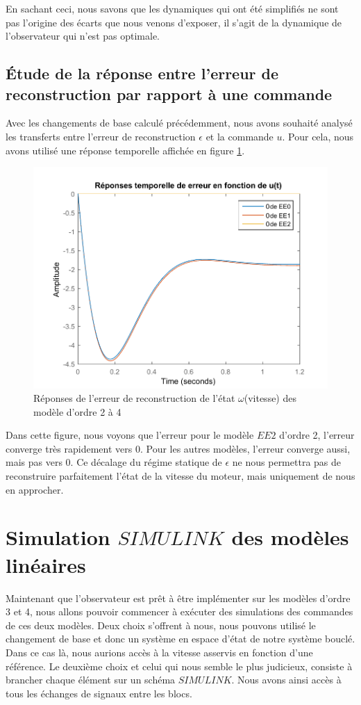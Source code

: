 En sachant ceci, nous savons que les dynamiques qui ont été simplifiés ne sont pas l'origine des écarts que nous venons d'exposer, il s'agit de la dynamique de l'observateur qui n'est pas optimale. 

\subsection{Étude de la réponse entre l'erreur de reconstruction par rapport à une commande}\label{sub:etudeTransfertErreurCommande}
Avec les changements de base calculé précédemment, nous avons souhaité analysé les transferts entre l'erreur de reconstruction $\epsilon$ et la commande $u$. Pour cela, nous avons utilisé une réponse temporelle affichée en figure \ref{fig:repTemporelle_erreurReconstruction}.  
\begin{figure}[!ht]
\centering
\includegraphics[width= .9\textwidth]{./III/figure/reponses_temp-erreurDeReconstruction.pdf}
\caption{\label{fig:repTemporelle_erreurReconstruction}Réponses de l'erreur de reconstruction de l'état $\omega$(vitesse) des modèle d'ordre 2 à 4}
\end{figure}Dans cette figure, nous voyons que l'erreur pour le modèle $EE2$ d'ordre 2, l'erreur converge très rapidement vers 0. Pour les autres modèles, l'erreur converge aussi, mais pas vers 0. Ce décalage du régime statique de $\epsilon$ ne nous permettra pas de reconstruire parfaitement l'état de la vitesse du moteur, mais uniquement de nous en approcher. 


\section{Simulation $SIMULINK$ des modèles linéaires}
Maintenant que l'observateur est prêt à être implémenter sur les modèles d'ordre 3 et 4, nous allons pouvoir commencer à exécuter des simulations des commandes de ces deux modèles. Deux choix s'offrent à nous, nous pouvons utilisé le changement de base et donc un système en espace d'état de notre système bouclé. Dans ce cas là, nous aurions accès à la vitesse asservis en fonction d'une référence. Le deuxième choix et celui qui nous semble le plus judicieux, consiste à brancher chaque élément sur un schéma $SIMULINK$. Nous avons ainsi accès à tous les échanges de signaux entre les blocs. 


